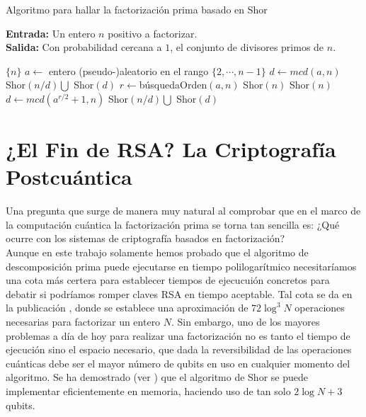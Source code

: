 \documentclass[11pt, spanish]{report}
\makeatletter
\numberwithin{equation}{section}
\numberwithin{defin}{section}
\newenvironment{megaalgorithm}[1][htb]{%
    \renewcommand{\ALG@name}{Algoritmo}%
   \begin{algorithm}[#1]%
  }{\end{algorithm}}
\makeatother
\begin{document}
\begin{megaalgorithm}[h]
\caption{Algoritmo para hallar la factorización prima basado en Shor}\label{ShorAlg}
\hspace*{\algorithmicindent} \textbf{Entrada:} Un entero $n$ positivo a factorizar. \\
\hspace*{\algorithmicindent} \textbf{Salida:} Con probabilidad cercana a $1$, el conjunto de divisores primos de $n$.
\begin{algorithmic}[1]

	 \Return $\{n\}$
	\EndIf
	\State $a \leftarrow $ entero (pseudo\footnotemark{}-)aleatorio en el rango $\{2,\cdots,n-1\}$
	\State $d \leftarrow mcd(a,n)$
	 \Return Shor$(n/d) \bigcup $ Shor$(d)$ 
	\Else \hspace{0.1cm} $ r\leftarrow$búsquedaOrden$(a,n)$
	\EndIf
	 \Return Shor$(n)$
	\Else {} \Return Shor$(n)$
	\EndIf
	\EndIf
	\State $d \leftarrow mcd(a^{r/2}+1, n)$
	\State \Return Shor$(n/d) \bigcup $ Shor$(d)$
	
\EndProcedure
\end{algorithmic}
\end{megaalgorithm}


\section{¿El Fin de RSA? La Criptografía Postcuántica}

Una pregunta que surge de manera muy natural al comprobar que en el marco de la computación cuántica la factorización prima se torna tan sencilla es: ¿Qué ocurre con los sistemas de criptografía basados en factorización? \\

Aunque en este trabajo solamente hemos probado que el algoritmo de descomposición prima puede ejecutarse en tiempo polilogarítmico necesitaríamos una cota más certera para establecer tiempos de ejecucuión concretos para debatir si podríamos romper claves RSA en tiempo aceptable. Tal cota se da en la publicación \cite{PhysRevA.54.1034}, donde se establece una aproximación de $72\log^3 N$ operaciones necesarias para factorizar un entero $N$. Sin embargo, uno de los mayores problemas a día de hoy para realizar una factorización no es tanto el tiempo de ejecución sino el espacio necesario, que dada la reversibilidad de las operaciones cuánticas debe ser el mayor número de qubits en uso en cualquier momento del algoritmo. Se ha demostrado (ver \cite{2002quant.ph..5095B}) que el algoritmo de Shor se puede implementar eficientemente en memoria, haciendo uso de tan solo $2\log N + 3$ qubits. \\
\end{document}
